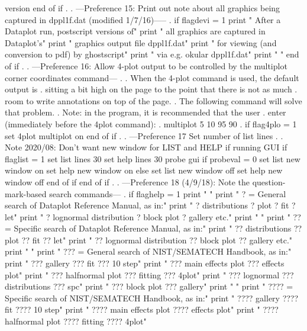    version
end of if
.
. ---Preference 15: Print out note about all graphics being captured in dppl1f.dat (modified 1/7/16)-----
.
if flagdevi = 1
   print "      After a Dataplot run, postscript versions of"
   print "      all graphics are captured in Dataplot's"
   print "      graphics output file     dppl1f.dat"
   print "      for viewing (and conversion to pdf) by ghostscript"
   print "      via e.g.    okular dppl1f.dat"
   print " "
end of if
.
. ---Preference 16: Allow 4-plot output to be controlled by the    multiplot corner coordinates    command---
.
.    When the 4-plot command is used, the default output is
.    sitting a bit high on the page to the point that there is not as much
.    room to write annotations on top of the page.
.    The following command will solve that problem.
.    Note: in the program, it is recommended that the user
.          enter (immediately before the 4plot command):
.             multiplot 5 10 95 90
.
if flag4plo = 1
   set 4plot multiplot on
end of if
.
. ---Preference 17 Set number of list lines
.
.    Note 2020/08: Don't want new window for LIST and HELP if running GUI
if flaglist = 1
   set list lines 30
   set help lines 30
   probe gui
   if probeval = 0
      set list new window on
      set help new window on
   else
      set list new window off
      set help new window off
   end of if
end of if
.
. ---Preference 18 (4/9/18): Note the question-mark-based search commands---
.
if flaghelp = 1
   print " "
   print "      ? = General  search of Dataplot Reference Manual, as in:"
   print "          ? distributions   ? plot   ? fit   ? let"
   print "          ? lognormal distribution   ? block plot   ? gallery   etc."
   print " "
   print "     ?? = Specific search of Dataplot Reference Manual, as in:"
   print "          ?? distributions   ?? plot   ?? fit   ?? let"
   print "          ?? lognormal distribution    ?? block plot   ?? gallery   etc."
   print " "
   print "    ??? = General  search of NIST/SEMATECH Handbook, as in:"
   print "          ??? gallery   ??? fit   ??? 10 step"
   print "          ??? main effects plot   ??? effects plot"
   print "          ??? halfnormal plot     ??? fitting   ??? 4plot"
   print "          ??? lognormal   ??? distributions   ??? spc"
   print "          ??? block plot  ??? gallery"
   print " "
   print "   ???? = Specific search of NIST/SEMATECH Handbook, as in:"
   print "          ???? gallery   ???? fit   ???? 10 step"
   print "          ???? main effects plot   ???? effects plot"
   print "          ???? halfnormal plot     ???? fitting   ???? 4plot"
